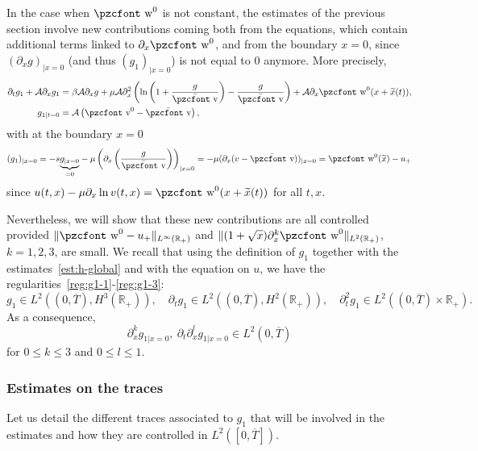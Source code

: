\documentclass[10pt]{amsart}
\theoremstyle{definition}\newtheorem{defi}[theo]{Definition}\newtheorem{rema}[theo]{Remark}\newtheorem{exam}[theo]{Example}\newtheorem{exem}[theo]{Example}\newtheorem{nota}[theo]{Notation}
\newcommand{\mathpzc}[1]{\text{\pzcfont #1}}
\newcommand{\R}{\mathbb{R}}
\newcommand{\p}{\partial}
\newcommand{\bv}{\bar{\mathpzc{v}}}
\newcommand{\cA}{\mathcal A}
\newcommand{\tv}{\mathpzc{v}}
\newcommand{\tw}{\mathpzc{w}}
\newcommand{\tx}{\widetilde{x}}
\begin{document}
In the case when $\tw^0$ is not constant, the estimates of the previous section involve new contributions coming both from the equations, which contain additional terms linked to $\partial_x \tw^0$, and from the boundary $x=0$, since $(\partial_x g)_{|x=0}$ (and thus $(g_1)_{|x=0}$) is not equal to $0$ anymore. More precisely,
\begin{equation}\label{eq:g1-w0}
\begin{split}
\p_t g_1 + \cA \p_x g_1
&= \beta \cA \p_x g + \mu \cA \p_x^2\left(\ln\left(1+ \frac{g}{\bv}\right) - \frac{g}{\bv}\right) + \cA \partial_x \tw^0(x+ \tx(t)),\\
 g_{1|t=0} &=\cA\left(\tv^0-\bv\right),
\end{split}
\end{equation} 
with at the boundary $x=0$
\begin{equation}\label{eq:g1-x0}
(g_1)_{|x=0} = -s\underset{=0}{\underbrace{g_{|x=0}}} - \mu \left(\partial_x\left(\dfrac{g}{\bv}\right)\right)_{|x=0} = - \mu (\partial_x (v -\bv))_{|x=0} = \tw^0(\tx) -u_+
\end{equation}
since $u(t,x) - \mu \p_x \ln v(t,x)=\tw^0(x+\tx(t))$ for all $t,x$.


Nevertheless, we will show that these new contributions are all controlled provided $\|\tw^0 - u_+\|_{L^\infty(\R_+)}$ and $\|(1+\sqrt{x})\partial^k_x \tw^0\|_{L^2(\R_+)}$, $k=1,2,3$, are small. We recall that using the definition of $g_1$ together with the estimates~\eqref{est:h-global} and with the equation on $u$, we have the regularities~\eqref{reg:g1-1}-\eqref{reg:g1-3}:
\[
g_1\in L^2\left((0,\overline{T}), H^3(\R_+)\right),\quad \p_t g_1\in L^2\left((0,\overline{T}), H^2(\R_+)\right), \quad \p_t^2 g_1\in L^2\left((0,\overline{T})\times \R_+\right).
\]
As a consequence,
\[
\p_x^k g_{1|x=0},\ \p_t \p_x^l g_{1|x=0}\in L^2(0,\overline{T})
\]
for $0\leq k\leq 3$ and $0\leq l \leq 1$.

\subsubsection{Estimates on the traces} Let us detail the different traces associated to $g_1$ that will be involved in the estimates and how they are controlled in $L^2([0, \overline{T}])$.
\end{document}
